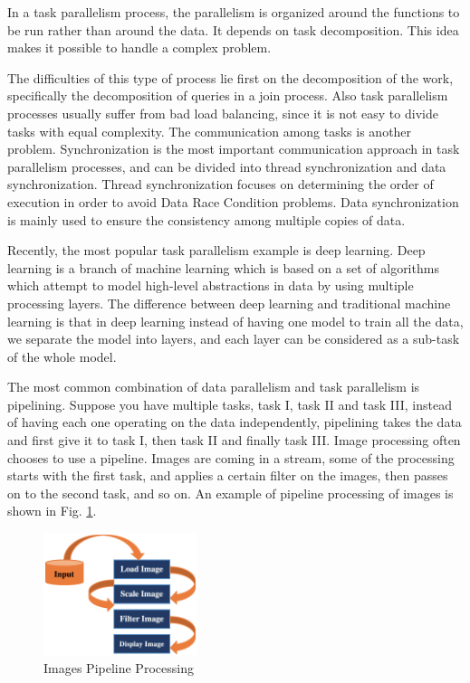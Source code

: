 \documentclass[	DIV=calc,%
							paper=a4,%
							fontsize=11pt,%
							twocolumn]{scrartcl}	 					%
\begin{document}
In a task parallelism process, the parallelism is organized around the functions to be run rather than around the data. It depends on task decomposition. This idea makes it possible to handle a complex problem. 

The difficulties of this type of process lie first on the decomposition of the work, specifically the decomposition of queries in a join process. Also task parallelism processes usually suffer from bad load balancing, since it is not easy to divide tasks with equal complexity. The communication among tasks is another problem. Synchronization is the most important communication approach in task parallelism processes, and can be divided into thread synchronization and data synchronization. Thread synchronization focuses on determining the order of execution in order to avoid Data Race Condition problems. Data synchronization is mainly used to ensure the consistency among multiple copies of data.

Recently, the most popular task parallelism example is deep learning. Deep learning is a branch of machine learning which is based on a set of algorithms which attempt to model high-level abstractions in data by using multiple processing layers. The difference between deep learning and traditional machine learning is that in deep learning instead of having one model to train all the data, we separate the model into layers, and each layer can be considered as a sub-task of the whole model.

The most common combination of data parallelism and task parallelism is pipelining. Suppose you have multiple tasks, task I, task II and task III, instead of having each one operating on the data independently, pipelining takes the data and first give it to task I, then task II and finally task III. Image processing often chooses to use a pipeline. Images are coming in a stream, some of the processing starts with the first task, and applies a certain filter on the images, then passes on to the second task, and so on. 
An example of pipeline processing of images is shown in Fig. \ref{fig:task_para}.

\begin{figure}
  \centering
    \includegraphics[width=0.4\textwidth]{images/task_para.png}
    \caption{Images Pipeline Processing}
    \label{fig:task_para}   
\end{figure}
\end{document}
